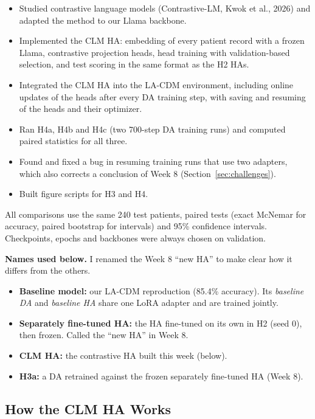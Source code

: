 \documentclass[11pt]{article}
\begin{document}
\begin{itemize}
  \item Studied contrastive language models (Contrastive-LM, Kwok et al.,
        2026) and adapted the method to our Llama backbone.
  \item Implemented the CLM HA: embedding of every patient record with a frozen
        Llama, contrastive projection heads, head training with validation-based
        selection, and test scoring in the same format as the H2 HAs.
  \item Integrated the CLM HA into the LA-CDM environment, including online
        updates of the heads after every DA training step, with saving and
        resuming of the heads and their optimizer.
  \item Ran H4a, H4b and H4c (two 700-step DA training runs) and computed paired
        statistics for all three.
  \item Found and fixed a bug in resuming training runs that use two adapters,
        which also corrects a conclusion of Week 8 (Section~\ref{sec:challenges}).
  \item Built figure scripts for H3 and H4.
\end{itemize}

All comparisons use the same 240 test patients, paired tests (exact McNemar for
accuracy, paired bootstrap for intervals) and 95\% confidence intervals.
Checkpoints, epochs and backbones were always chosen on validation.

\textbf{Names used below.} I renamed the Week 8 ``new HA'' to make clear how it
differs from the others.
\begin{itemize}
  \item \textbf{Baseline model:} our LA-CDM reproduction (85.4\% accuracy). Its
        \emph{baseline DA} and \emph{baseline HA} share one LoRA adapter and are
        trained jointly.
  \item \textbf{Separately fine-tuned HA:} the HA fine-tuned on its own in H2
        (seed 0), then frozen. Called the ``new HA'' in Week 8.
  \item \textbf{CLM HA:} the contrastive HA built this week (below).
  \item \textbf{H3a:} a DA retrained against the frozen separately fine-tuned
        HA (Week 8).
\end{itemize}

\subsection*{How the CLM HA Works}
\end{document}
